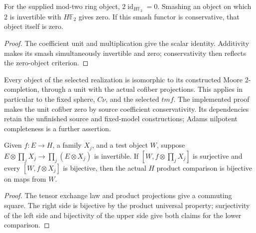 \begin{proposition}
  \label{prop:coefficient-two-invertible-vanishing}
  \leanok
  For the supplied mod-two ring object, $2\operatorname{id}_{H\mathbb F_2}=0$.
  Smashing an object on which $2$ is invertible with $H\mathbb F_2$
  gives zero. If this smash functor is conservative, that object
  itself is zero.
\end{proposition}
\begin{proof}
  The coefficient unit and multiplication give the scalar identity.
  Additivity makes its smash simultaneously invertible and zero;
  conservativity then reflects the zero-object criterion.
  \leanok
\end{proof}

\begin{proposition}
  \label{prop:fixed-moore-completeness}
  \notready
  Every object of the selected realization is isomorphic to its
  constructed Moore $2$-completion, through a unit with the actual
  cofiber projections. This applies in particular to the fixed sphere,
  $C\nu$, and the selected $tmf$. The implemented proof makes the unit
  cofiber zero by source coefficient conservativity. Its dependencies
  retain the unfinished source and fixed-model constructions; Adams
  nilpotent completeness is a further assertion.
\end{proposition}

\begin{proposition}
  \label{prop:tensor-product-comparison-approximation}
  \leanok
  Given $f:E\to H$, a family $X_j$, and a test object $W$,
  suppose $E\otimes\prod_jX_j\to\prod_j(E\otimes X_j)$ is
  invertible. If $[W,f\otimes\prod_jX_j]$ is surjective and
  every $[W,f\otimes X_j]$ is bijective, then the actual $H$
  product comparison is bijective on maps from $W$.
\end{proposition}
\begin{proof}
  The tensor exchange law and product projections give a commuting
  square. The right side is bijective by the product universal property;
  surjectivity of the left side and bijectivity of the upper side give
  both claims for the lower comparison.
  \leanok
\end{proof}

